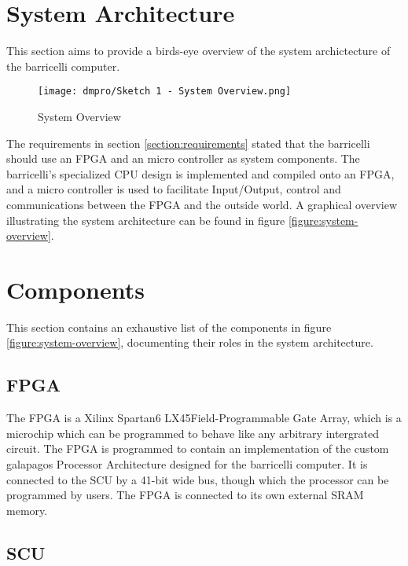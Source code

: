 \section{System Architecture}

This section aims to provide a birds-eye overview of the system archictecture of the \Gls{barricelli} computer.

\begin{figure}[H]
\texttt{[image: dmpro/Sketch 1 - System Overview.png]}
\caption{System Overview}
\label{figure:system-overview}
\end{figure}

The requirements in section \vref{section:requirements} stated that the \Gls{barricelli} should use an \gls{FPGA} and an micro controller as system components.
The \Gls{barricelli}'s specialized CPU design is implemented and compiled onto an \gls{FPGA}, and a micro controller is used to facilitate Input/Output, control and communications between the \gls{FPGA} and the outside world.
A graphical overview illustrating the system architecture can be found in figure \vref{figure:system-overview}.

\section{Components}

This section contains an exhaustive list of the components in figure \vref{figure:system-overview}, documenting their roles in the system architecture.

\subsection{\gls{FPGA}}

The \gls{FPGA} is a Xilinx Spartan6 LX45\cn Field-Programmable Gate Array, which is a microchip which can be programmed to behave like any arbitrary intergrated circuit.
The \gls{FPGA} is programmed to contain an implementation of the custom \Gls{galapagos} Processor Architecture designed for the \Gls{barricelli} computer.
It is connected to the \gls{SCU} by a 41-bit wide bus, though which the processor can be programmed by users.
The \gls{FPGA} is connected to its own external \gls{SRAM} memory.

\subsection{\gls{SCU}}

